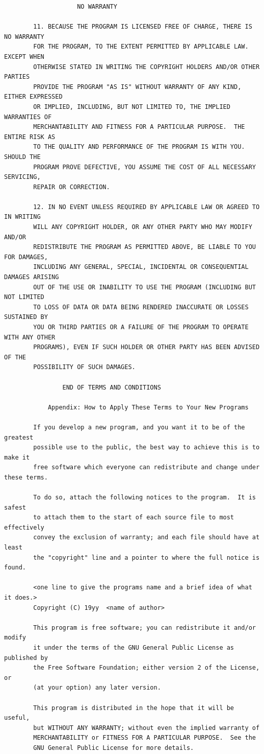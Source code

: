\documentclass[a4paper,twoside,12pt]{book}
\begin{document}
{\begin{verbatim}
					NO WARRANTY

		11. BECAUSE THE PROGRAM IS LICENSED FREE OF CHARGE, THERE IS NO WARRANTY
		FOR THE PROGRAM, TO THE EXTENT PERMITTED BY APPLICABLE LAW.  EXCEPT WHEN
		OTHERWISE STATED IN WRITING THE COPYRIGHT HOLDERS AND/OR OTHER PARTIES
		PROVIDE THE PROGRAM "AS IS" WITHOUT WARRANTY OF ANY KIND, EITHER EXPRESSED
		OR IMPLIED, INCLUDING, BUT NOT LIMITED TO, THE IMPLIED WARRANTIES OF
		MERCHANTABILITY AND FITNESS FOR A PARTICULAR PURPOSE.  THE ENTIRE RISK AS
		TO THE QUALITY AND PERFORMANCE OF THE PROGRAM IS WITH YOU.  SHOULD THE
		PROGRAM PROVE DEFECTIVE, YOU ASSUME THE COST OF ALL NECESSARY SERVICING,
		REPAIR OR CORRECTION.

		12. IN NO EVENT UNLESS REQUIRED BY APPLICABLE LAW OR AGREED TO IN WRITING
		WILL ANY COPYRIGHT HOLDER, OR ANY OTHER PARTY WHO MAY MODIFY AND/OR
		REDISTRIBUTE THE PROGRAM AS PERMITTED ABOVE, BE LIABLE TO YOU FOR DAMAGES,
		INCLUDING ANY GENERAL, SPECIAL, INCIDENTAL OR CONSEQUENTIAL DAMAGES ARISING
		OUT OF THE USE OR INABILITY TO USE THE PROGRAM (INCLUDING BUT NOT LIMITED
		TO LOSS OF DATA OR DATA BEING RENDERED INACCURATE OR LOSSES SUSTAINED BY
		YOU OR THIRD PARTIES OR A FAILURE OF THE PROGRAM TO OPERATE WITH ANY OTHER
		PROGRAMS), EVEN IF SUCH HOLDER OR OTHER PARTY HAS BEEN ADVISED OF THE
		POSSIBILITY OF SUCH DAMAGES.

				END OF TERMS AND CONDITIONS

			Appendix: How to Apply These Terms to Your New Programs

		If you develop a new program, and you want it to be of the greatest
		possible use to the public, the best way to achieve this is to make it
		free software which everyone can redistribute and change under these terms.

		To do so, attach the following notices to the program.  It is safest
		to attach them to the start of each source file to most effectively
		convey the exclusion of warranty; and each file should have at least
		the "copyright" line and a pointer to where the full notice is found.

		<one line to give the programs name and a brief idea of what it does.>
		Copyright (C) 19yy  <name of author>

		This program is free software; you can redistribute it and/or modify
		it under the terms of the GNU General Public License as published by
		the Free Software Foundation; either version 2 of the License, or
		(at your option) any later version.

		This program is distributed in the hope that it will be useful,
		but WITHOUT ANY WARRANTY; without even the implied warranty of
		MERCHANTABILITY or FITNESS FOR A PARTICULAR PURPOSE.  See the
		GNU General Public License for more details.


\end{verbatim}}
\end{document}
